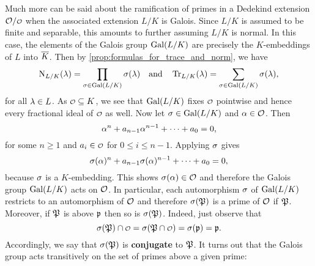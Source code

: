   \section{}
    Much more can be said about the ramification of primes in a Dedekind extension $\mc{O}/\smc{O}$ when the associated extension $L/K$ is Galois. Since $L/K$ is assumed to be finite and separable, this amounts to further assuming $L/K$ is normal. In this case, the elements of the Galois group $\operatorname{\mathrm{Gal}}(L/K)$ are precisely the $K$-embeddings of $L$ into $\overline{K}$. Then by \cref{prop:formulas_for_trace_and_norm}, we have
    \[
      \operatorname{\mathrm{N}}_{L/K}(\lambda) = \prod_{\sigma \in \operatorname{\mathrm{Gal}}(L/K)}\sigma(\lambda) \quad \text{and} \quad \operatorname{\mathrm{Tr}}_{L/K}(\lambda) = \sum_{\sigma \in \operatorname{\mathrm{Gal}}(L/K)}\sigma(\lambda),
    \]
    for all $\lambda \in L$. As $\smc{O} \subseteq K$, we see that $\operatorname{\mathrm{Gal}}(L/K)$ fixes $\smc{O}$ pointwise and hence every fractional ideal of $\smc{O}$ as well. Now let $\sigma \in \operatorname{\mathrm{Gal}}(L/K)$ and $\alpha \in \mathcal{O}$. Then
    \[
      \alpha^{n}+a_{n-1}\alpha^{n-1}+\cdots+a_{0} = 0,
    \]
    for some $n \ge 1$ and $a_{i} \in \smc{O}$ for $0 \le i \le n-1$. Applying $\sigma$ gives
     \[
      \sigma(\alpha)^{n}+a_{n-1}\sigma(\alpha)^{n-1}+\cdots+a_{0} = 0,
    \]
    because $\sigma$ is a $K$-embedding. This shows $\sigma(\alpha) \in \mathcal{O}$ and therefore the Galois group $\operatorname{\mathrm{Gal}}(L/K)$ acts on $\mathcal{O}$. In particular, each automorphism $\sigma$ of $\operatorname{\mathrm{Gal}}(L/K)$ restricts to an automorphism of $\mathcal{O}$ and therefore $\sigma(\mathfrak{P})$ is a prime of $\mathcal{O}$ if $\mathfrak{P}$. Moreover, if $\mathfrak{P}$ is above $\mathfrak{p}$ then so is $\sigma(\mathfrak{P})$. Indeed, just observe that
    \[
      \s(\mf{P}) \cap \smc{O} = \s(\mf{P} \cap \smc{O}) = \s(\mf{p}) = \mf{p}.
    \]
    Accordingly, we say that $\sigma(\mathfrak{P})$ is \textbf{conjugate} to $\mathfrak{P}$. It turns out that the Galois group acts transitively on the set of primes above a given prime:

